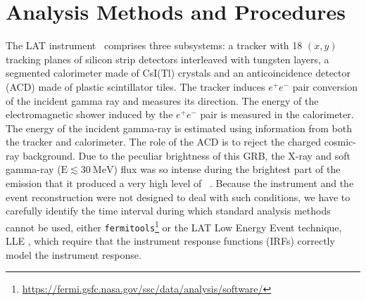 \documentclass[preprint]{aastex631}
\begin{document}
\section{Analysis Methods and Procedures}
\label{sec:analysis}
%
The LAT instrument~\citep{2009ApJ...697.1071A} comprises three subsystems: a tracker with 18 $(x,y)$ tracking planes of silicon strip detectors interleaved with tungsten layers, a segmented calorimeter made of CsI(Tl) crystals and an anticoincidence detector (ACD) made of plastic scintillator tiles. The tracker induces $e^+e^-$ pair conversion of the incident gamma ray and measures its direction. The energy of the electromagnetic shower induced by the $e^+e^-$ pair is measured in the calorimeter. The energy of the incident gamma-ray is estimated using information from both the tracker and calorimeter. The role of the ACD is to reject the charged cosmic-ray background.
Due to the peculiar brightness of this GRB, the X-ray and soft gamma-ray ($\mathrm{E} \lesssim 30~\mathrm{MeV}$) flux was so intense during the brightest part of the emission that it produced a very high level of ~\citep{2022GCN.32760....1O}. Because the instrument and the event reconstruction were not designed to deal with such conditions, we have to carefully identify the time interval  during which standard analysis methods cannot be used, either \texttt{fermitools}\footnote{\url{https://fermi.gsfc.nasa.gov/ssc/data/analysis/software/}} or the LAT Low Energy Event technique, LLE \citep{PelassaLLE, LLESolarFlare}, which require that the  instrument response functions (IRFs) correctly model the instrument response.

\end{document}
